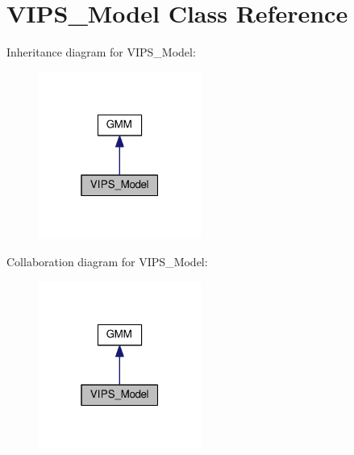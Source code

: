 \hypertarget{classVIPS__Model}{}\section{V\+I\+P\+S\+\_\+\+Model Class Reference}
\label{classVIPS__Model}


Inheritance diagram for V\+I\+P\+S\+\_\+\+Model\+:
\nopagebreak
\begin{figure}[H]
\begin{center}
\leavevmode
\includegraphics[width=151pt]{classVIPS__Model__inherit__graph}
\end{center}
\end{figure}


Collaboration diagram for V\+I\+P\+S\+\_\+\+Model\+:
\nopagebreak
\begin{figure}[H]
\begin{center}
\leavevmode
\includegraphics[width=151pt]{classVIPS__Model__coll__graph}
\end{center}
\end{figure}
